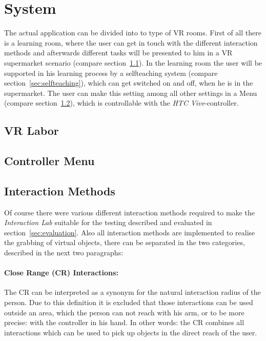 
\section{System}\label{sec:System}
The actual application can be divided into to type of VR rooms. First of all there is a learning room, where the user can get in touch with the different interaction methods and afterwards different tasks will be presented to him in a VR supermarket scenario (compare section~\ref{sec:VRLabor}). In the learning room the user will be supported in his learning process by a selfteaching system (compare section~\ref{sec:selfteaching}), which can get switched on and off, when he is in the supermarket. The user can make this setting among all other settings in a Menu  (compare section~\ref{sec:Menu}), which is controllable with the \textit{HTC Vive}-controller. 

\subsection{VR Labor}\label{sec:VRLabor}

\subsection{Controller Menu} \label{sec:Menu}

\subsection{Interaction Methods}\label{sec:Interactions}
Of course there were various different interaction methods required to make the \textit{Interaction Lab} suitable for the testing described and evaluated in section~\ref{sec:evaluation}. Also all interaction methods are implemented to realise the grabbing of virtual objects, there can be separated in the two categories, described in the next two paragraphs:

\paragraph{Close Range (CR) Interactions:} The CR can be interpreted as a synonym for the natural interaction radius of the person. Due to this definition it is excluded that those interactions can be used outside an area, which the person can not reach with his arm, or to be more precise: with the controller in his hand. In other words: the CR combines all interactions which can be used to pick up objects in the direct reach of the user.

